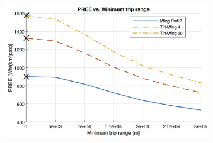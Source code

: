 \begin{figure}[h]
\begin{subfigure}[t]{0.33\textwidth}
    \includegraphics[width=\textwidth]{Figures/report_PREE.png}
    \captionsetup{justification=centering}
    \caption{}
    \label{fig:sens03}
\end{subfigure}
\captionsetup{justification=centering}
\caption{}
\label{fig:sens0123}
\end{figure}


